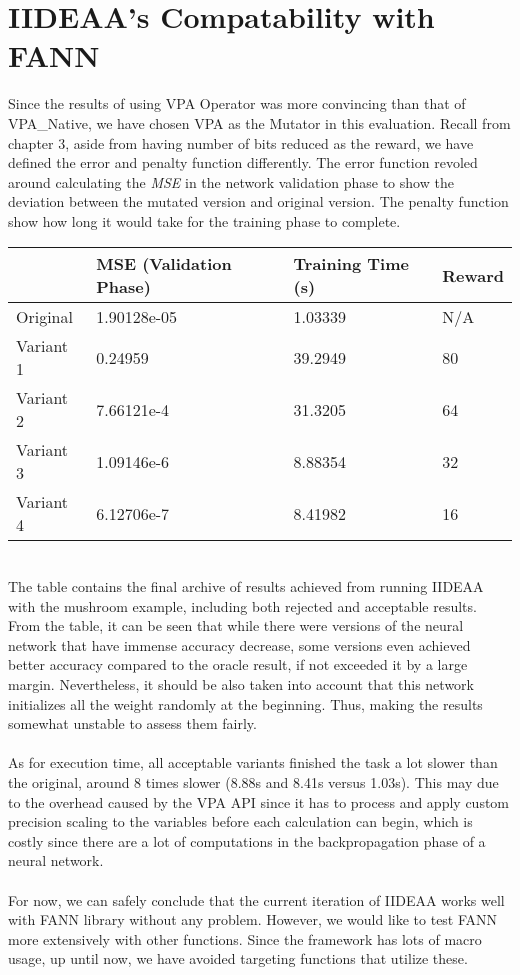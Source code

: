 \section{IIDEAA's Compatability with FANN}
Since the results of using VPA Operator was more convincing than that of VPA\_Native, we have chosen VPA as the Mutator in this evaluation. Recall from chapter 3, aside from having number of bits reduced as the reward, we have defined the error and penalty function differently. The error function revoled around calculating the \textit{MSE} in the network validation phase to show the deviation between the mutated version and original version. The penalty function show how long it would take for the training phase to complete. \\
\newpage
\begingroup
\begin{table}[H]
\centering
\begin{tabular}{|l|l|l|l|}
\hline
 & MSE (Validation Phase) & Training Time (s) & Reward \\ \hline
Original & 1.90128e-05 & 1.03339 & N/A \\ \hline
Variant 1 & 0.24959 & 39.2949 & 80 \\ \hline
Variant 2 & 7.66121e-4 & 31.3205 & 64 \\ \hline
Variant 3 & 1.09146e-6 & 8.88354 & 32 \\ \hline
Variant 4 & 6.12706e-7 & 8.41982 & 16 \\ \hline
\end{tabular}
\end{table}
\endgroup
\vspace*{1cm}
~\\
The table contains the final archive of results achieved from running IIDEAA with the mushroom example, including both rejected and acceptable results. From the table, it can be seen that while there were versions of the neural network that have immense accuracy decrease, some versions even achieved better accuracy compared to the oracle result, if not exceeded it by a large margin. Nevertheless, it should be also taken into account that this network initializes all the weight randomly at the beginning. Thus, making the results somewhat unstable to assess them fairly. \\
~\\
As for execution time, all acceptable variants finished the task a lot slower than the original, around 8 times slower (8.88s and 8.41s versus 1.03s). This may due to the overhead caused by the VPA API since it has to process and apply custom precision scaling to the variables before each calculation can begin, which is costly since there are a lot of computations in the backpropagation phase of a neural network. \\
~\\
For now, we can safely conclude that the current iteration of IIDEAA works well with FANN library without any problem. However, we would like to test FANN more extensively with other functions. Since the framework has lots of macro usage, up until now, we have avoided targeting functions that utilize these. \\